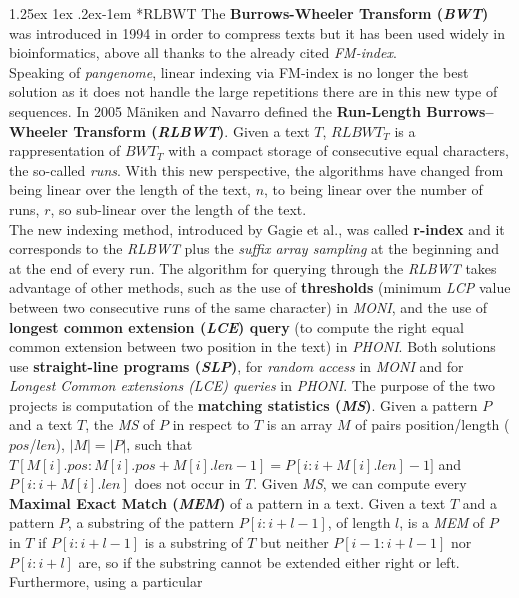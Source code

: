 \documentclass[a4paper,11pt, oneside]{article}
\makeatletter
\renewcommand{\paragraph}{%
  \@startsection{paragraph}{4}%
  {\z@}{1.25ex \@plus 1ex \@minus .2ex}{-1em}%
  {\normalfont\normalsize\bfseries}%
}
\makeatother
\begin{document}
\paragraph*{RLBWT}
The \textbf{Burrows-Wheeler Transform (\textit{BWT})} was introduced
in 1994 in order to compress texts but it has been used widely
in bioinformatics, above all thanks to the already cited
\textit{FM-index}.\\
Speaking of \textit{pangenome}, linear indexing via FM-index is no longer the
best solution as it does not handle the large repetitions there are in this new
type of sequences. In 2005 M\"{a}niken and Navarro defined 
the \textbf{Run-Length Burrows–Wheeler Transform (\textit{RLBWT})}. Given a text
$T$, $RLBWT_T$ is a rappresentation of $BWT_T$ with a compact storage of
consecutive equal characters, the so-called \textit{runs}. With this new
perspective, the algorithms have changed from being linear over the length of
the text, $n$, to being linear over the number of runs, $r$, so sub-linear over
the length of the text. \\ 
The new indexing method, introduced by Gagie et al., was called \textbf{r-index}
and it corresponds to the \textit{RLBWT} plus the \textit{suffix array sampling}
at the beginning and at the end of every run. The algorithm for querying through
the \textit{RLBWT} takes advantage of other methods, such as the use of
\textbf{thresholds} (minimum \textit{LCP} value between two consecutive runs of
the same character) in \textit{MONI}, and the use of \textbf{longest common
  extension (\textit{LCE}) query} (to compute the right equal common extension
between two position in the text) in \textit{PHONI}. Both solutions use
\textbf{straight-line programs (\textit{SLP})}, for \textit{random 
  access} in \textit{MONI} and for \textit{Longest Common extensions (LCE)
  queries} in \textit{PHONI}. 
The purpose of the two projects is computation of the \textbf{matching
  statistics (\textit{MS})}. Given a pattern $P$ and a text $T$, the \textit{MS}
of $P$ in respect to $T$ is an array $M$ of pairs position/length ($pos$/$len$),
$|M|=|P|$, such that $T[M[i].pos:M[i].pos+M[i].len-1]=P[i:i+M[i].len]-1]$ and
$P[i:i+M[i].len]$ does not occur in $T$. Given \textit{MS}, we can compute every
\textbf{Maximal Exact Match (\textit{MEM})} of a pattern in a text. Given a
text $T$ and a pattern $P$, a substring of the pattern $P[i : i+l-1]$, of length
$l$, is a \textit{MEM} of $P$ in $T$ if $P[i:i+l-1]$ is a substring of $T$ but
neither $P[i-1:i+l-1]$ nor $P[i:i+l]$ are, so if the substring cannot be
extended either right or left. Furthermore, using a particular
\end{document}
